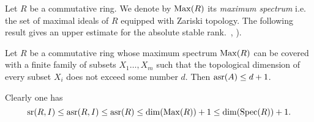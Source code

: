 Let $R$ be a commutative ring. We denote by $\operatorname{Max}(R)$ its {\it maximum spectrum} i.e. the set of maximal ideals of $R$ equipped with Zariski topology.
The following result gives an upper estimate for the absolute stable rank.~\cite[Theorem~2.3]{EO}, \cite[Theorem~3.7]{MKV}).
\begin{thm} Let $R$ be a commutative ring whose maximum spectrum 
$\operatorname{Max}(R)$ can be covered with a finite family of subsets $X_1\ldots, X_m$ such that the topological dimension of every subset $X_i$
does not exceed some number $d$. Then $\operatorname{asr}(A)\leq d+1$. \end{thm}
Clearly one has \begin{equation}\nonumber \operatorname{sr}(R, I)\leq \operatorname{asr}(R, I)\leq \operatorname{asr}(R) \leq \dim(\operatorname{Max}(R))+1\leq \dim(\operatorname{Spec}(R))+1.\end{equation}